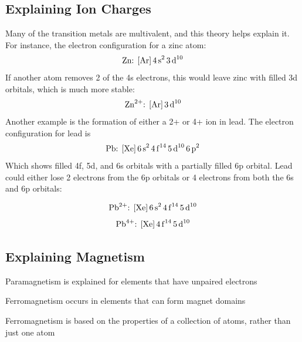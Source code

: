 \subsection{Explaining Ion Charges}
Many of the transition metals are multivalent, and this theory helps explain it. For instance,
the electron configuration for a zinc atom:
\[
    \text{Zn: }\ch{[Ar] 4s^2 3d^10}
\]
If another atom removes 2 of the 4s electrons, this would leave zinc with filled 3d orbitals,
which is much more stable:
\[
    \ch{Zn^{2+}}\text{: }\ch{[Ar] 3d^10}
\]
Another example is the formation of either a 2+ or 4+ ion in lead. The electron configuration
for lead is
\[
    \text{Pb: }\ch{[Xe] 6s^2 4f^14 5d^10 6p^2}
\]
Which shows filled 4f, 5d, and 6s orbitals with a partially filled 6p orbital. Lead could either
lose 2 electrons from the 6p orbitals or 4 electrons from both the 6s and 6p orbitals:

\[
    \ch{Pb^{2+}}\text{: }\ch{[Xe] 6s^2 4f^14 5d^10}
\]
\[
    \ch{Pb^{4+}}\text{: }\ch{[Xe] 4f^14 5d^10}
\]

\subsection{Explaining Magnetism}
\begin{bulleted-list}
    \item Paramagnetism is explained for elements that have unpaired electrons
    \item Ferromagnetism occurs in elements that can form magnet domains
    \item Ferromagnetism is based on the properties of a collection of atoms, rather than just
        one atom
\end{bulleted-list}

